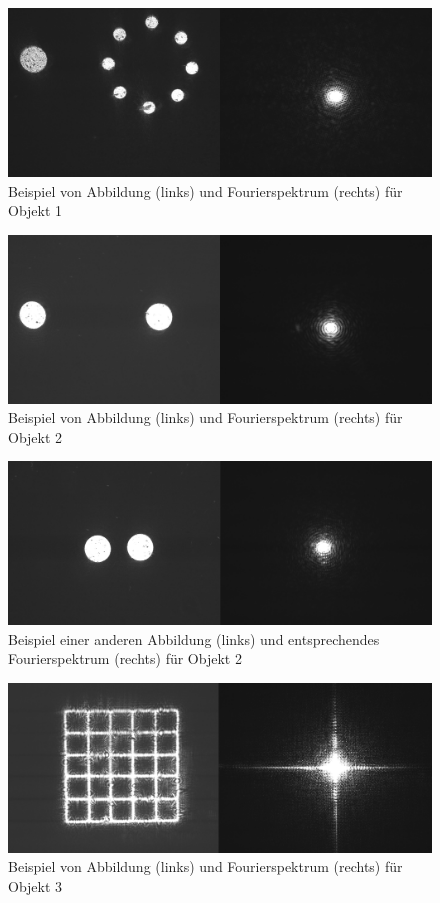 \begin{figure}
	\centering
	\includegraphics[width=0.7\linewidth]{images/example1.png}
	\caption{
		Beispiel von Abbildung (links) und Fourierspektrum (rechts) für Objekt 1
	}
	\label{fig:example1}
\end{figure}

\begin{figure}
	\centering
	\includegraphics[width=0.7\linewidth]{images/example2.png}
	\caption{Beispiel von Abbildung (links) und Fourierspektrum (rechts) für Objekt 2}
	\label{fig:example2}
\end{figure}

\begin{figure}
	\centering
	\includegraphics[width=0.7\linewidth]{images/example3.png}
	\caption{Beispiel einer anderen Abbildung (links) und entsprechendes Fourierspektrum (rechts) für Objekt 2}
	\label{fig:example3}
\end{figure}

\begin{figure}
	\centering
	\includegraphics[width=0.7\linewidth]{images/example13.png}
	\caption{Beispiel von Abbildung (links) und Fourierspektrum (rechts) für Objekt 3}
	\label{fig:example13}
\end{figure}

